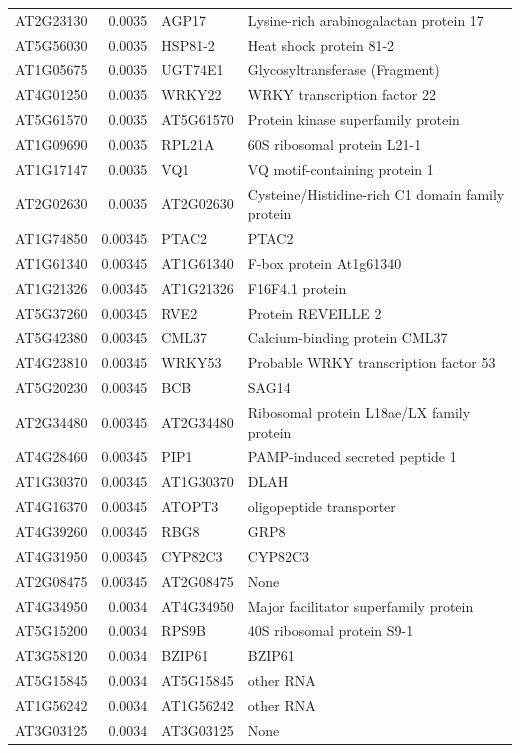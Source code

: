 \documentclass[11pt]{article}
\begin{document}
\begin{center}
\begin{tabular}{lrll}
AT2G23130 & 0.0035 & AGP17 & Lysine-rich arabinogalactan protein 17\\
AT5G56030 & 0.0035 & HSP81-2 & Heat shock protein 81-2\\
AT1G05675 & 0.0035 & UGT74E1 & Glycosyltransferase (Fragment)\\
AT4G01250 & 0.0035 & WRKY22 & WRKY transcription factor 22\\
AT5G61570 & 0.0035 & AT5G61570 & Protein kinase superfamily protein\\
AT1G09690 & 0.0035 & RPL21A & 60S ribosomal protein L21-1\\
AT1G17147 & 0.0035 & VQ1 & VQ motif-containing protein 1\\
AT2G02630 & 0.0035 & AT2G02630 & Cysteine/Histidine-rich C1 domain family protein\\
AT1G74850 & 0.00345 & PTAC2 & PTAC2\\
AT1G61340 & 0.00345 & AT1G61340 & F-box protein At1g61340\\
AT1G21326 & 0.00345 & AT1G21326 & F16F4.1 protein\\
AT5G37260 & 0.00345 & RVE2 & Protein REVEILLE 2\\
AT5G42380 & 0.00345 & CML37 & Calcium-binding protein CML37\\
AT4G23810 & 0.00345 & WRKY53 & Probable WRKY transcription factor 53\\
AT5G20230 & 0.00345 & BCB & SAG14\\
AT2G34480 & 0.00345 & AT2G34480 & Ribosomal protein L18ae/LX family protein\\
AT4G28460 & 0.00345 & PIP1 & PAMP-induced secreted peptide 1\\
AT1G30370 & 0.00345 & AT1G30370 & DLAH\\
AT4G16370 & 0.00345 & ATOPT3 & oligopeptide transporter\\
AT4G39260 & 0.00345 & RBG8 & GRP8\\
AT4G31950 & 0.00345 & CYP82C3 & CYP82C3\\
AT2G08475 & 0.00345 & AT2G08475 & None\\
AT4G34950 & 0.0034 & AT4G34950 & Major facilitator superfamily protein\\
AT5G15200 & 0.0034 & RPS9B & 40S ribosomal protein S9-1\\
AT3G58120 & 0.0034 & BZIP61 & BZIP61\\
AT5G15845 & 0.0034 & AT5G15845 & other RNA\\
AT1G56242 & 0.0034 & AT1G56242 & other RNA\\
AT3G03125 & 0.0034 & AT3G03125 & None\\

\end{tabular}
\end{center}
\end{document}
